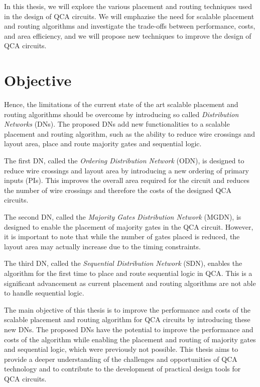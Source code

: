 In this thesis, we will explore the various placement and routing techniques used in the design of QCA circuits. We will emphazise the need for scalable placement and routing algorithms and investigate the trade-offs between performance, costs, and area efficiency, and we will propose new techniques to improve the design of QCA circuits.

\section{Objective}
Hence, the limitations of the current state of the art scalable placement and routing algorithms should be overcome by introducing so called \emph{Distribution Networks} (DNs). The proposed DNs add new functionalities to a scalable placement and routing algorithm, such as the ability to reduce wire crossings and layout area, place and route majority gates and sequential logic.

The first DN, called the \emph{Ordering Distribution Network} (ODN), is designed to reduce wire crossings and layout area by introducing a new ordering of primary inputs (PIs). This improves the overall area required for the circuit and reduces the number of wire crossings and therefore the costs of the designed QCA circuits.

The second DN, called the \emph{Majority Gates Distribution Network} (MGDN), is designed to enable the placement of majority gates in the QCA circuit. However, it is important to note that while the number of gates placed is reduced, the layout area may actually increase due to the timing constraints.

The third DN, called the \emph{Sequential Distribution Network }(SDN), enables the algorithm for the first time to place and route sequential logic in QCA. This is a significant advancement as current placement and routing algorithms are not able to handle sequential logic.

The main objective of this thesis is to improve the performance and costs of the scalable placement and routing algorithm for QCA circuits by introducing these new DNs. The proposed DNs have the potential to improve the performance and costs of the algorithm while enabling the placement and routing of majority gates and sequential logic, which were previously not possible. This thesis aims to provide a deeper understanding of the challenges and opportunities of QCA technology and to contribute to the development of practical design tools for QCA circuits.

